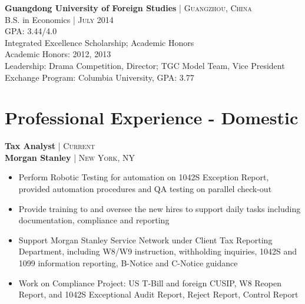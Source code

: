 \documentclass[10pt]{article} %
\begin{document}
{\begin{minipage}[t]{0.5\textwidth}
\textbf{Guangdong University of Foreign Studies} {\hfill\footnotesize\textsc{| Guangzhou, China}}\\
B.S. in Economics {\hfill\footnotesize\textsc{| July 2014}}\\
GPA: 3.44/4.0\\
Integrated Excellence Scholarship; Academic Honors\\
Academic Honors: 2012, 2013\\
Leadership: Drama Competition, Director; TGC Model Team, Vice President\\
Exchange Program: Columbia University, GPA: 3.77


\section{Professional Experience - Domestic} 



{\raggedright\normalsize
\textbf{Tax Analyst} {\hfill\footnotesize\textsc{| Current}}\\ 
\textbf{Morgan Stanley} {\hfill\footnotesize\textsc{| New York, NY}}}

\begin{itemize}[leftmargin=*, topsep=2pt, partopsep=2.5pt]
\setlength\itemsep{1pt}

\item Perform Robotic Testing for automation on 1042S Exception Report, provided automation procedures and QA testing on parallel check-out
 
\item Provide training to and oversee the new hires to support daily tasks including documentation, compliance and reporting
 
\item Support Morgan Stanley Service Network under Client Tax Reporting Department, including W8/W9 instruction, withholding inquiries, 1042S and 1099 information reporting, B-Notice and C-Notice guidance

\item Work on Compliance Project: US T-Bill and foreign CUSIP, W8 Reopen Report, and 1042S Exceptional Audit Report, Reject Report, Control Report 


\end{itemize}
\end{minipage}}
\end{document}
